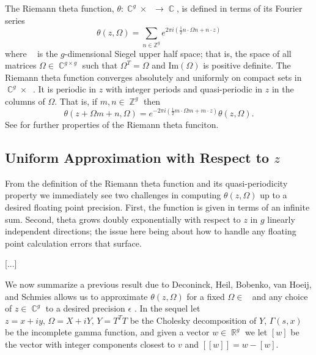 \documentclass[12]{article}
\DeclareMathOperator{\ZZ}{\mathbb{Z}}
\DeclareMathOperator{\RR}{\mathbb{R}}
\DeclareMathOperator{\CC}{\mathbb{C}}
\DeclareMathOperator{\hg}{\mathfrak{h}_g}
\begin{document}
The Riemann theta function, $\theta : \CC^g \times \hg \to \CC$, is defined in
terms of its Fourier series
\begin{equation}\label{eq:theta}
  \theta(z,\Omega) = \sum_{n \in \mathbb{Z}^g}
  e^{2\pi i \left( \tfrac{1}{2} n \cdot \Omega n + n \cdot z \right)}
\end{equation}
where $\hg$ is the $g$-dimensional Siegel upper half space; that is, the space
of all matrices $\Omega \in \CC^{g \times g}$ such that $\Omega^T = \Omega$ and
$\text{Im}(\Omega)$ is positive definite. The Riemann theta function converges
absolutely and uniformly on compact sets in $\CC^g \times \hg$. It is periodic
in $z$ with integer periods and quasi-periodic in $z$ in the columns of
$\Omega$. That is, if $m,n \in \ZZ^g$ then
\begin{equation}\label{eq:theta transform}
  \theta(z + \Omega m + n, \Omega) = e^{-2\pi i \left( \tfrac{1}{2} m
    \cdot \Omega m + m \cdot z \right)} \theta(z,\Omega).
\end{equation}
See \cite{DLMF,Mumford:2007ww,Mumford:2007wm} for further properties of the
Riemann theta funciton.

\subsection{Uniform Approximation with Respect to $z$}

From the definition of the Riemann theta function and its quasi-periodicity
property we immediately see two challenges in computing $\theta(z,\Omega)$ up
to a desired floating point precision. First, the function is given in terms of
an infinite sum. Second, theta grows doubly exponentially with respect to $z$
in $g$ linearly independent directions; the issue here being about how to
handle any floating point calculation errors that surface.

[...]

We now summarize a previous result due to Deconinck, Heil, Bobenko, van Hoeij,
and Schmies allows us to approximate $\theta(z,\Omega)$ for a fixed $\Omega \in
\hg$ and any choice of $z \in \CC^g$ to a desired precision $\epsilon$
\cite{Deconinck:2004uc}. In the sequel let $z=x + iy, \, \Omega = X + iY, \, Y
= T^TT$ be the Cholesky decomposition of $Y$, $\Gamma(s,x)$ be the incomplete
gamma function, and given a vector $w \in \RR^g$ we let $[w]$ be the vector
with integer components closest to $v$ and $[[w]] = w - [w]$.
\end{document}
